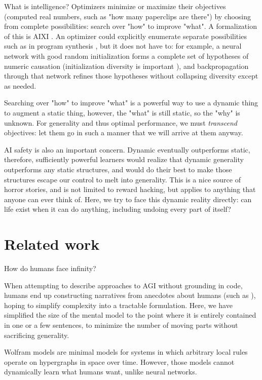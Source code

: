 \documentclass{article}
\begin{document}
What is intelligence? Optimizers minimize or maximize their objectives (computed real numbers, such as "how many paperclips are there") by choosing from complete possibilities: search over "how" to improve "what". A formalization of this is AIXI \cite{DBLP:journals/corr/cs-AI-0004001}. An optimizer could explicitly enumerate separate possibilities such as in program synthesis \cite{ellis2020dreamcoder}, but it does not have to: for example, a neural network with good random initialization forms a complete set of hypotheses of numeric causation (initialization diversity is important \cite{mellor2021neural}), and backpropagation through that network refines those hypotheses without collapsing diversity except as needed.

Searching over "how" to improve "what" is a powerful way to use a dynamic thing to augment a static thing, however, the "what" is still static, so the "why" is unknown. For generality and thus optimal performance, we must \textit{transcend} objectives: let them go in such a manner that we will arrive at them anyway.

AI safety is also an important concern. Dynamic eventually outperforms static, therefore, sufficiently powerful learners would realize that dynamic generality outperforms any static structures, and would do their best to make those structures escape our control to melt into generality. This is a nice source of horror stories, and is not limited to reward hacking, but applies to anything that anyone can ever think of. Here, we try to face this dynamic reality directly: can life exist when it can do anything, including undoing every part of itself?

\section{Related work}

How do humans face infinity?

When attempting to describe approaches to AGI without grounding in code, humans end up constructing narratives from anecdotes about humans (such as \cite{DBLP:journals/corr/abs-2102-03406}), hoping to simplify complexity into a tractable formulation. Here, we have simplified the size of the mental model to the point where it is entirely contained in one or a few sentences, to minimize the number of moving parts without sacrificing generality.

Wolfram models \cite{Wolfram_2020} are minimal models for systems in which arbitrary local rules operate on hypergraphs in space over time. However, those models cannot dynamically learn what humans want, unlike neural networks.
\end{document}
